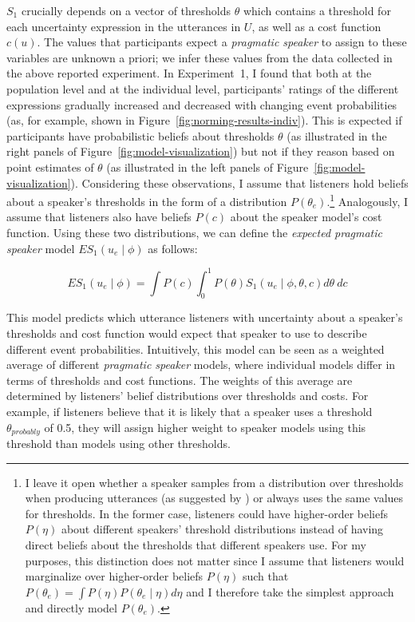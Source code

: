 $S_1$ crucially depends on a vector of thresholds $\theta$ which contains a threshold for each uncertainty expression in the utterances in $U$, 
as well as a cost function $c(u)$. The values that participants expect a \textit{pragmatic speaker} to assign 
to these variables are unknown a priori; we infer these values from the data collected in the above reported experiment. 
In Experiment~1, I found that both at the population level and at the individual level, 
participants' ratings of the different expressions gradually increased and decreased with changing event probabilities 
(as, for example, shown in Figure~\ref{fig:norming-results-indiv}). This is expected if participants
have probabilistic beliefs about thresholds $\theta$ (as illustrated in the right panels of Figure~\ref{fig:model-visualization}) but not if they reason based on point estimates of $\theta$ (as illustrated in the left panels of Figure~\ref{fig:model-visualization}).
Considering these observations,  I assume that listeners hold beliefs about a speaker's thresholds in the form of a distribution $P\left(\theta_e\right)$.\footnote{I leave it open 
whether a {speaker} samples from a distribution over thresholds when producing utterances (as suggested by \cite{Qing2015}) 
or always uses the same values for thresholds. In the former case, listeners could have higher-order beliefs  $P(\eta)$ 
about different {speakers}' threshold distributions instead of having direct beliefs about the thresholds that different 
{speakers} use. For my purposes, this distinction does not matter since I assume that listeners would marginalize over higher-order beliefs $P(\eta)$ such that  $P\left(\theta_e\right) = \int P\left(\eta\right) P\left(\theta_e \mid \eta\right) d\eta$ and I therefore take the simplest approach and directly model $P\left(\theta_e\right)$. } Analogously, I assume that  listeners also have beliefs $P(c)$ about the speaker model's cost function.
Using these two distributions, we can define the \textit{expected pragmatic speaker} model $ES_1\left(u_e \mid \phi \right)$ as follows:

$$ES_1\left(u_e \mid \phi \right) = \int P(c) \int_0^1 P(\theta) S_1\left(u _e\mid \phi, \theta, c\right) d\theta \  d c$$

This model predicts which utterance listeners with uncertainty about a speaker's thresholds and cost function would expect that {speaker} to use to describe different event probabilities. 
Intuitively, this model can be seen as a weighted average of different \textit{pragmatic speaker} models, where individual models differ in terms of thresholds and cost functions.  The weights of this average are determined by listeners' belief distributions over thresholds and costs. For example, if listeners believe that it is likely that a speaker uses a threshold $\theta_{probably}$ of 0.5, they will assign higher weight to speaker models
using this threshold than models using other thresholds. 

